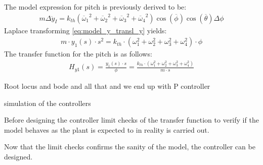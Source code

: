 The model expression for pitch is previously derived to be:
\begin{align}
m\Delta\ddot{y}_I = k_{th}({\overline{\omega}_1}^2+{\overline{\omega}_2}^2+{\overline{\omega}_3}^2+{\overline{\omega}_4}^2)\cos(\overline{\phi})\cos(\overline{\theta})\Delta\phi
\label{eq:model_y_transl}
\end{align}
Laplace transforming \autoref{eq:model_y_transl_y} yields:
\begin{align}
m\cdot y_1(s)\cdot s^2= k_{th}\cdot (\omega_1 ^2 + \omega_2 ^2 + \omega_3 ^2 + \omega_4 ^2)\cdot \phi
\end{align}
The transfer function for the pitch is as follows:
\begin{align}
H_{y1}(s)=\frac{y_1(s)\cdot s}{\phi}=\frac{k_{th}\cdot (\omega_1 ^2 + \omega_2 ^2 + \omega_3 ^2 + \omega_4 ^2)}{m\cdot s}
\end{align}
\begin{where}
\end{where}
 
Root locus and bode and all that and we end up with P controller

simulation of the controllers

Before designing the controller limit checks of the transfer function to verify if the model behaves as the plant is expected to in reality is carried out. \\

Now that the limit checks confirms the sanity of the model, the controller can be designed. \\